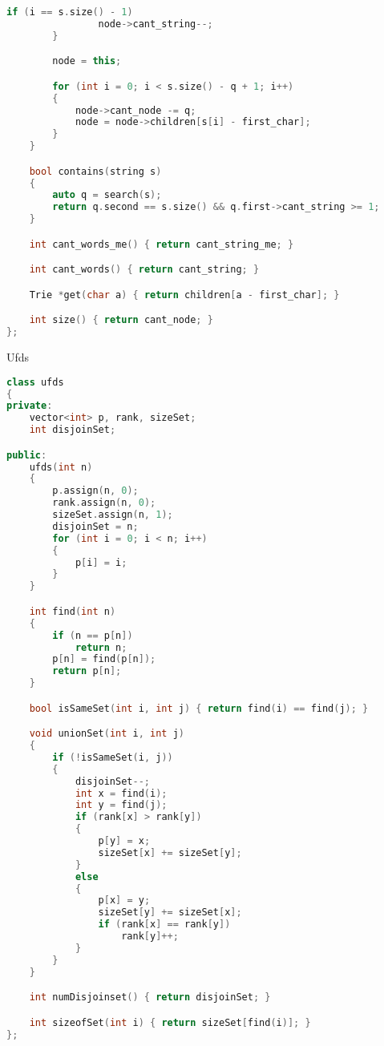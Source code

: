 \documentclass[leter]{amsart}
\begin{document}
\begin{multicols}{2}
\begin{lstlisting}[language=C++]
            if (i == s.size() - 1)
                node->cant_string--;
        }

        node = this;

        for (int i = 0; i < s.size() - q + 1; i++)
        {
            node->cant_node -= q;
            node = node->children[s[i] - first_char];
        }
    }

    bool contains(string s)
    {
        auto q = search(s);
        return q.second == s.size() && q.first->cant_string >= 1;
    }

    int cant_words_me() { return cant_string_me; }

    int cant_words() { return cant_string; }

    Trie *get(char a) { return children[a - first_char]; }

    int size() { return cant_node; }
};

\end{lstlisting}
\end{multicols}
Ufds
\begin{multicols}{2}
\begin{lstlisting}[language=C++]
class ufds
{
private:
    vector<int> p, rank, sizeSet;
    int disjoinSet;

public:
    ufds(int n)
    {
        p.assign(n, 0);
        rank.assign(n, 0);
        sizeSet.assign(n, 1);
        disjoinSet = n;
        for (int i = 0; i < n; i++)
        {
            p[i] = i;
        }
    }

    int find(int n)
    {
        if (n == p[n])
            return n;
        p[n] = find(p[n]);
        return p[n];
    }

    bool isSameSet(int i, int j) { return find(i) == find(j); }

    void unionSet(int i, int j)
    {
        if (!isSameSet(i, j))
        {
            disjoinSet--;
            int x = find(i);
            int y = find(j);
            if (rank[x] > rank[y])
            {
                p[y] = x;
                sizeSet[x] += sizeSet[y];
            }
            else
            {
                p[x] = y;
                sizeSet[y] += sizeSet[x];
                if (rank[x] == rank[y])
                    rank[y]++;
            }
        }
    }

    int numDisjoinset() { return disjoinSet; }

    int sizeofSet(int i) { return sizeSet[find(i)]; }
};

\end{lstlisting}
\end{multicols}
\end{document}
